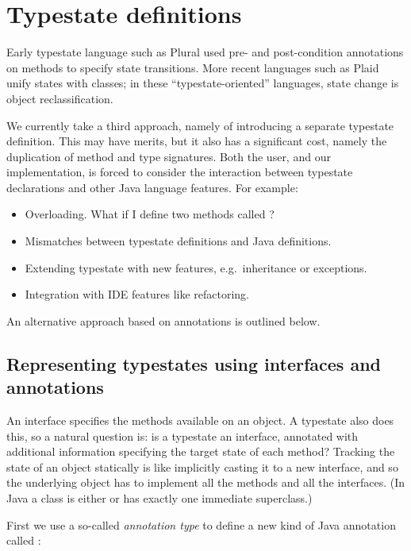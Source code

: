 \section{Typestate definitions}

Early typestate language such as Plural \cite{bierhoff11} used pre-
and post-condition annotations on methods to specify state
transitions. More recent languages such as Plaid \cite{garcia14} unify
states with classes; in these ``typestate-oriented'' languages, state
change is object reclassification.

We currently take a third approach, namely of introducing a separate
typestate definition. This may have merits, but it also has a
significant cost, namely the duplication of method and type
signatures. Both the user, and our implementation, is forced to
consider the interaction between typestate declarations and other Java
language features. For example:

\begin{itemize}
\item Overloading. What if I define two methods called ?
\item Mismatches between typestate definitions and Java definitions.
\item Extending typestate with new features, e.g.~inheritance or
  exceptions.
\item Integration with IDE features like refactoring.
\end{itemize}

\noindent An alternative approach based on annotations is outlined
below.

\subsection{Representing typestates using interfaces and annotations}

An interface specifies the methods available on an object. A typestate
also does this, so a natural question is: is a typestate an interface,
annotated with additional information specifying the target state of
each method? Tracking the state of an object statically is like
implicitly casting it to a new interface, and so the underlying object
has to implement all the methods and all the interfaces. (In Java a
class is either  or has exactly one immediate superclass.)

First we use a so-called \emph{annotation type} to define a new kind
of Java annotation called :

